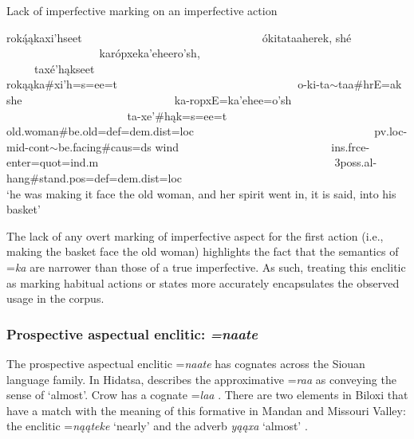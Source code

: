 \begin{exe}

\item\label{notimperfective} Lack of imperfective marking on an imperfective action

\glll roką́ąkaxi'hseet ~ ~ ~ ~ ~ ~ ~ ~ ~ ~ ~ ~ ~ ~ ~ ~ ~ ~ ~  ókitataaherek, shé ~ ~ ~ ~ ~ ~ ~ ~ ~ ~ ~ ~ ~ ~ ~ ~ karópxeka'eheero'sh, ~ ~ ~ ~ ~ ~ ~ ~ ~ ~ ~ ~ ~ ~ ~ ~ ~ ~ ~ ~ ~ ~ ~ ~ ~ taxé'hąkseet\\
	rokąąka\#xi'h=s=ee=t ~ ~ ~ ~ ~ ~ ~ ~ ~ ~ ~ ~ ~ ~ ~ ~ ~ ~ ~  o-ki-ta$\sim$taa\#hrE=ak she ~ ~ ~ ~ ~ ~ ~ ~ ~ ~ ~ ~ ~ ~ ~ ~ ka-ropxE=ka'ehee=o'sh ~ ~ ~ ~ ~ ~ ~ ~ ~ ~ ~ ~ ~ ~ ~ ~ ~ ~ ~ ~ ~ ~ ~ ~ ~ ta-xe'\#hąk=s=ee=t\\
	\textnormal{old.woman}\#\textnormal{be.old}=def=dem.dist=loc ~ ~ ~ ~ ~ ~ ~ ~ ~ ~ ~ ~ ~ ~ ~ ~ ~ ~ ~  pv.loc-mid-cont$\sim$\textnormal{be.facing}\#caus=ds \textnormal{wind} ~ ~ ~ ~ ~ ~ ~ ~ ~ ~ ~ ~ ~ ~ ~ ~ ins.frce-\textnormal{enter}=quot=ind.m ~ ~ ~ ~ ~ ~ ~ ~ ~ ~ ~ ~ ~ ~ ~ ~ ~ ~ ~ ~ ~ ~ ~ ~ ~ 3poss.al-\textnormal{hang}\#\textnormal{stand}.pos=def=dem.dist=loc\\
	\glt `he was making it face the old woman, and her spirit went in, it is said, into his basket' \citep[148]{hollow1973a}

\end{exe}

The lack of any overt marking of imperfective aspect for the first action (i.e., making the basket face the old woman) highlights the fact that the semantics of =\textit{ka} are narrower than those of a true imperfective. As such, treating this enclitic as marking habitual actions or states more accurately encapsulates the observed usage in the corpus.

\subsubsection{Prospective aspectual enclitic: \textit{=naate}}\label{prospectiveaspectualenclitic}

The prospective aspectual enclitic =\textit{naate} has cognates across the Siouan language family. In Hidatsa, \citet[165]{boyle2007} describes the approximative =\textit{raa} as conveying the sense of `almost'. Crow has a cognate =\textit{laa} \citep[164]{graczyk2007}. There are two elements in Biloxi that have a match with the meaning of this formative in Mandan and Missouri Valley: the enclitic =\textit{nąąteke} `nearly' and the adverb \textit{yąąxa} `almost' \citep{kaufman2011}. %


